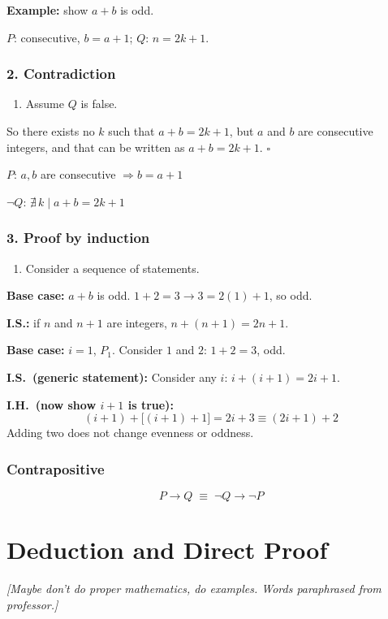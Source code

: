 \documentclass[11pt]{article}
\newcommand{\note}[1]{\textcolor{red!60!black}{\textit{[#1]}}}
\begin{document}
\textbf{Example:} show $a+b$ is odd.

$P$: consecutive, $b = a+1$; \quad $Q$: $n = 2k+1$.

\subsubsection*{2. Contradiction}
\begin{enumerate}[label=\arabic*)]
  \item Assume $Q$ is false.
\end{enumerate}
So there exists no $k$ such that $a+b = 2k+1$, but $a$ and $b$ are consecutive integers, and that can be written as $a+b = 2k+1$. \hfill $\square$

$P$: $a, b$ are consecutive $\Rightarrow b = a+1$

$\neg Q$: $\nexists\, k \mid a+b = 2k+1$

\subsubsection*{3. Proof by induction}
\begin{enumerate}[label=\arabic*)]
  \item Consider a sequence of statements.
\end{enumerate}

\textbf{Base case:} $a+b$ is odd. $1+2 = 3 \to 3 = 2(1)+1$, so odd.

\textbf{I.S.:} if $n$ and $n+1$ are integers, $n + (n+1) = 2n+1$.

\medskip
\textbf{Base case:} $i = 1$, $P_1$. Consider $1$ and $2$: $1+2 = 3$, odd.

\textbf{I.S.\ (generic statement):} Consider any $i$: $i + (i+1) = 2i+1$.

\textbf{I.H.\ (now show $i+1$ is true):}
\[
  (i+1) + \bigl[(i+1)+1\bigr] = 2i+3 \equiv (2i+1) + 2
\]
Adding two does not change evenness or oddness.

\subsubsection*{Contrapositive}
\[
  P \to Q \;\equiv\; \neg Q \to \neg P
\]

\section{Deduction and Direct Proof}
\note{Maybe don't do proper mathematics, do examples. Words paraphrased from professor.}
\end{document}
